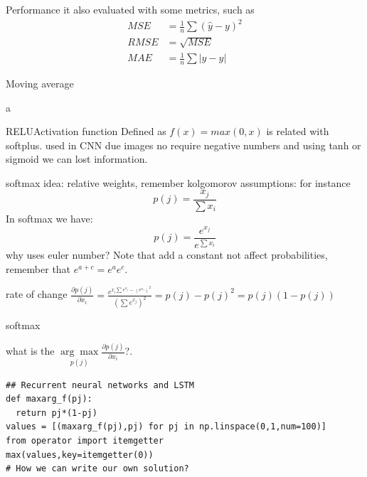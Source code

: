 \documentclass{beamer}
\begin{document}
\begin{frame}{Performance}
it also evaluated with some metrics, such as
\begin{equation*}
\begin{align*}
MSE &= \frac{1}{n} \sum (\hat{y} -y )^{2} \\
RMSE &= \sqrt{MSE} \\
MAE &= \frac{1}{n} \sum \vert \hat{y} -y \vert
\end{align*}
\end{equation*}
\end{frame}


\begin{frame}{Moving average}

a
\end{frame}



\begin{frame}{RELU}{Activation function}
Defined as $f(x) = max(0,x)$
is related with softplus.
used in CNN due images no require negative numbers and using tanh or sigmoid we can lost information.

\end{frame}



\begin{frame}{softmax}
idea: relative weights,
remember kolgomorov assumptions:
for instance $$ p(j)= \frac{x_{j}}{\sum x_{i}}$$
In softmax we have:
$$ p(j) =  \frac{e^{x_{j}}}{e^{\sum x_{i}}} $$
why uses euler number?
Note that add a constant not affect probabilities, remember that $e^{a+c} = e^{a}e^{c}$. 

\vspace{1cm}

rate of change $\frac{\partial p(j)}{\partial x_{i}}  =   \frac{e^{x_{i} \sum e^{x_{j}} - (e^{x_{i}})^{2} }} {(\sum e^{x_{j}})^{2}}  = p(j) - p(j)^{2} = p(j)(1-p(j))  $ 


\end{frame}


\begin{frame}[fragile]{softmax}

what is the $
   \underset{p(j)}{\arg\max}
 \frac{\partial p(j)}{\partial x_{i}}$?.
 
\begin{lstlisting}
## Recurrent neural networks and LSTM
def maxarg_f(pj):
  return pj*(1-pj)
values = [(maxarg_f(pj),pj) for pj in np.linspace(0,1,num=100)]
from operator import itemgetter
max(values,key=itemgetter(0))
# How we can write our own solution?
\end{lstlisting}

\end{frame}
\end{document}
